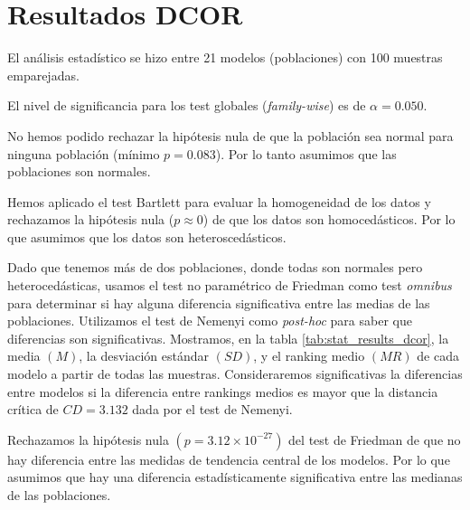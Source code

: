 \documentclass[a4paper,oneside,11pt,leqno]{article}
\begin{document}
	\section{Resultados DCOR}
	\label{sec:results_dcor}

	El análisis estadístico se hizo entre 21 modelos (poblaciones) con 100 muestras emparejadas.

	El nivel de significancia para los test globales (\textit{family-wise}) es de $\alpha=0.050$.

	No hemos podido rechazar la hipótesis nula de que la población sea normal para ninguna población (mínimo $p=0.083$). Por lo tanto asumimos que las poblaciones son normales.

	Hemos aplicado el test Bartlett para evaluar la homogeneidad de los datos y rechazamos la hipótesis nula ($p\approx 0$) de que los datos son homocedásticos. Por lo que asumimos que los datos son heteroscedásticos.

	Dado que tenemos más de dos poblaciones, donde todas son normales pero heterocedásticas, usamos el test no paramétrico de Friedman como test \textit{omnibus} para determinar si hay alguna diferencia significativa entre las medias de las poblaciones. Utilizamos el test de Nemenyi como \textit{post-hoc} para saber que diferencias son significativas. Mostramos, en la tabla \ref{tab:stat_results_dcor}, la media $(M)$, la desviación estándar $(SD)$, y el ranking medio $(MR)$ de cada modelo a partir de todas las muestras. Consideraremos significativas la diferencias entre modelos si la diferencia entre rankings medios es mayor que la distancia crítica de $CD=3.132$ dada por el test de Nemenyi.

	Rechazamos la hipótesis nula $(p=3.12\times 10^{-27})$ del test de Friedman de que no hay diferencia entre las medidas de tendencia central de los modelos. Por lo que asumimos que hay una diferencia estadísticamente significativa entre las medianas de las poblaciones.
\end{document}
